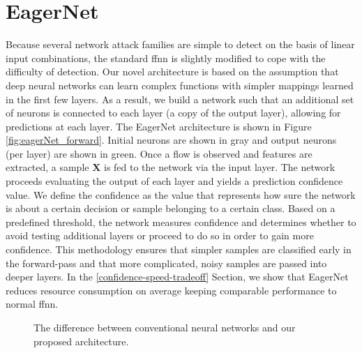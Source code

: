 \documentclass[conference]{IEEEtran}
\begin{document}
\section{EagerNet}

Because several network attack families are simple to detect on the basis of linear input combinations, the standard \gls{ffnn} is slightly modified to cope with the difficulty of detection. Our novel architecture is based on the assumption that deep neural networks can learn complex functions with simpler mappings learned in the first few layers. As a result, we build a network such that an additional set of neurons is connected to each layer (a copy of the output layer), allowing for predictions at each layer. The EagerNet architecture is shown in Figure \ref{fig:eagerNet_forward}. Initial neurons are shown in gray and output neurons (per layer) are shown in green. Once a flow is observed and features are extracted, a sample $\textbf{X}$ is fed to the network via the input layer. The network proceeds evaluating the output of each layer and yields a prediction confidence value. We define the confidence as the value that represents how sure the network is about a certain decision or sample belonging to a certain class. Based on a predefined threshold, the network measures confidence and determines whether to avoid testing additional layers or proceed to do so in order to gain more confidence. This methodology ensures that simpler samples are classified early in the forward-pass and that more complicated, noisy samples are passed into deeper layers. In the \ref{confidence-speed-tradeoff} Section, we show that EagerNet reduces resource consumption on average keeping comparable performance to normal \gls{ffnn}.


\begin{figure}[htp]
\center

\quad
{}

\caption{The difference between conventional neural networks and our proposed architecture.}

\end{figure}
\end{document}

